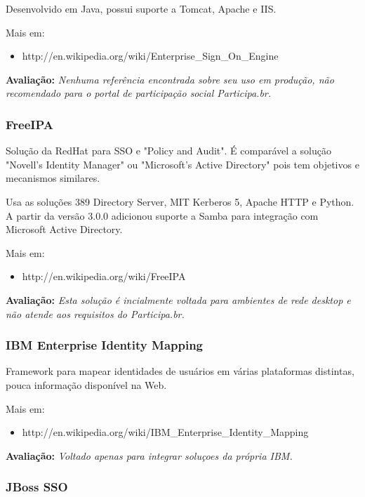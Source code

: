 \documentclass[11pt]{article}
\begin{document}
Desenvolvido em Java, possui suporte a Tomcat, Apache e IIS.

Mais em:
\begin{itemize}
  \item{http://en.wikipedia.org/wiki/Enterprise\_Sign\_On\_Engine}
\end{itemize}

{\bf Avaliação:} {\it Nenhuma referência encontrada sobre seu uso em produção,
não recomendado para o portal de participação social Participa.br.}

\subsubsection{FreeIPA}

Solução da RedHat para SSO e "Policy and Audit". É comparável a solução
"Novell's Identity Manager" ou "Microsoft's Active Directory" pois tem
objetivos e mecanismos similares.

Usa as soluções 389 Directory Server, MIT Kerberos 5, Apache HTTP e Python. A
partir da versão 3.0.0 adicionou suporte a Samba para integração com Microsoft
Active Directory.

Mais em:
\begin{itemize}
  \item{http://en.wikipedia.org/wiki/FreeIPA}
\end{itemize}

{\bf Avaliação:} {\it Esta solução é incialmente voltada para ambientes de
rede desktop e não atende aos requisitos do Participa.br.}

\subsubsection{IBM Enterprise Identity Mapping}

Framework para mapear identidades de usuários em várias plataformas distintas,
pouca informação disponível na Web.

Mais em:
\begin{itemize}
  \item{http://en.wikipedia.org/wiki/IBM\_Enterprise\_Identity\_Mapping}
\end{itemize}

{\bf Avaliação:} {\it Voltado apenas para integrar soluçoes da própria
IBM.}

\subsubsection{JBoss SSO}
\end{document}
